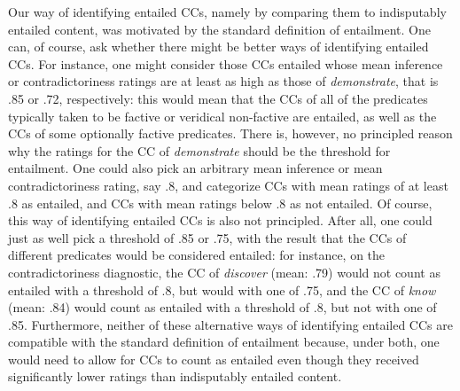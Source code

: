 \documentclass[11pt,fleqn]{article}
\newcommand{\6}{\mbox{$[\hspace*{-.6mm}[$}}
\newcommand{\9}{\mbox{$]\hspace*{-.6mm}]$}}
\begin{document}
{Our way of identifying entailed CCs, namely by comparing them to indisputably entailed content, was motivated by the standard definition of entailment. One can, of course, ask whether there might be better ways of identifying entailed CCs. For instance, one might consider those CCs entailed whose mean inference or contradictoriness ratings are at least as high as those of {\em demonstrate}, that is .85 or .72, respectively: this would mean that the CCs of all of the predicates typically taken to be factive or veridical non-factive are entailed, as well as the CCs of some optionally factive predicates. There is, however, no principled reason why the ratings for the CC of {\em demonstrate} should be the threshold for entailment. One could also pick an arbitrary mean inference or mean contradictoriness rating, say .8, and categorize CCs with mean ratings of at least .8 as entailed, and CCs with mean ratings below .8 as not entailed. Of course, this way of identifying entailed CCs is also not principled. After all, one could just as well pick a threshold of .85 or .75, with the result that the CCs of different predicates would be considered entailed: for instance, on the contradictoriness diagnostic, the CC of {\em discover} (mean: .79) would not count as entailed with a threshold of .8, but would with one of .75, and the CC of {\em know} (mean: .84) would count as entailed with a threshold of .8, but not with one  of .85. Furthermore, neither of these alternative ways of identifying entailed CCs are compatible with the standard definition of entailment because, under both, one would need to allow for CCs to count as entailed even though they received significantly lower ratings than indisputably entailed content.

}
\end{document}
